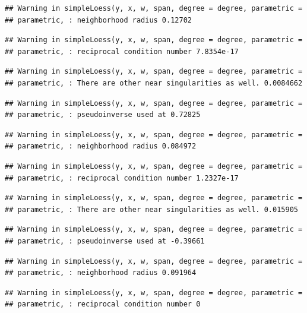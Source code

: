 \documentclass[]{article}
\begin{document}
\begin{verbatim}
## Warning in simpleLoess(y, x, w, span, degree = degree, parametric =
## parametric, : neighborhood radius 0.12702
\end{verbatim}

\begin{verbatim}
## Warning in simpleLoess(y, x, w, span, degree = degree, parametric =
## parametric, : reciprocal condition number 7.8354e-17
\end{verbatim}

\begin{verbatim}
## Warning in simpleLoess(y, x, w, span, degree = degree, parametric =
## parametric, : There are other near singularities as well. 0.0084662
\end{verbatim}

\begin{verbatim}
## Warning in simpleLoess(y, x, w, span, degree = degree, parametric =
## parametric, : pseudoinverse used at 0.72825
\end{verbatim}

\begin{verbatim}
## Warning in simpleLoess(y, x, w, span, degree = degree, parametric =
## parametric, : neighborhood radius 0.084972
\end{verbatim}

\begin{verbatim}
## Warning in simpleLoess(y, x, w, span, degree = degree, parametric =
## parametric, : reciprocal condition number 1.2327e-17
\end{verbatim}

\begin{verbatim}
## Warning in simpleLoess(y, x, w, span, degree = degree, parametric =
## parametric, : There are other near singularities as well. 0.015905
\end{verbatim}

\begin{verbatim}
## Warning in simpleLoess(y, x, w, span, degree = degree, parametric =
## parametric, : pseudoinverse used at -0.39661
\end{verbatim}

\begin{verbatim}
## Warning in simpleLoess(y, x, w, span, degree = degree, parametric =
## parametric, : neighborhood radius 0.091964
\end{verbatim}

\begin{verbatim}
## Warning in simpleLoess(y, x, w, span, degree = degree, parametric =
## parametric, : reciprocal condition number 0
\end{verbatim}
\end{document}
